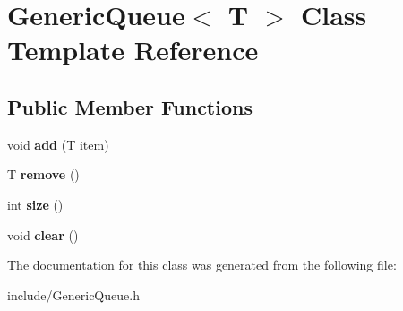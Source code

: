 \hypertarget{classGenericQueue}{\section{Generic\-Queue$<$ T $>$ Class Template Reference}
\label{classGenericQueue}
}
\subsection*{Public Member Functions}
\begin{DoxyCompactItemize}
\item 
\hypertarget{classGenericQueue_af5de20e93f3ee8d1fdd38a8ec1ae52f6}{void {\bfseries add} (T item)}\label{classGenericQueue_af5de20e93f3ee8d1fdd38a8ec1ae52f6}

\item 
\hypertarget{classGenericQueue_a15366cdc3234d238c664c82524f14c0b}{T {\bfseries remove} ()}\label{classGenericQueue_a15366cdc3234d238c664c82524f14c0b}

\item 
\hypertarget{classGenericQueue_aa94c712ca621ef5c121cd4f9c9188f67}{int {\bfseries size} ()}\label{classGenericQueue_aa94c712ca621ef5c121cd4f9c9188f67}

\item 
\hypertarget{classGenericQueue_a0fd02ceeecaf5c0903e3ee7199b183bc}{void {\bfseries clear} ()}\label{classGenericQueue_a0fd02ceeecaf5c0903e3ee7199b183bc}

\end{DoxyCompactItemize}


The documentation for this class was generated from the following file\-:\begin{DoxyCompactItemize}
\item 
include/Generic\-Queue.\-h\end{DoxyCompactItemize}
